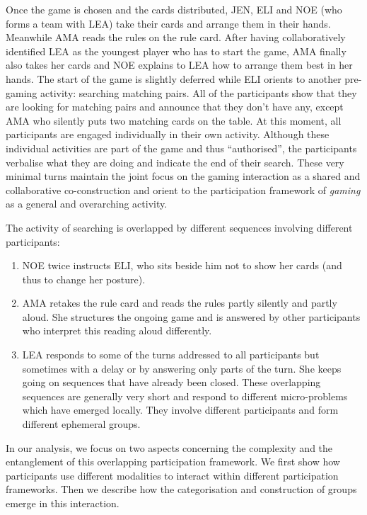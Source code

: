 \documentclass[output=paper]{langscibook}
\begin{document}
Once the game is chosen and the cards distributed, JEN, ELI and NOE (who forms a team with LEA) take their cards and arrange them in their hands. Meanwhile AMA reads the rules on the rule card. After having collaboratively identified LEA as the youngest player who has to start the game, AMA finally also takes her cards and NOE explains to LEA how to arrange them best in her hands. The start of the game is slightly deferred while ELI orients to another pre-gaming activity: searching matching pairs. All of the participants show that they are looking for matching pairs and announce that they don’t have any, except AMA who silently puts two matching cards on the table. At this moment, all participants are engaged individually in their own activity. Although these individual activities are part of the game and thus “authorised”, the participants verbalise what they are doing and indicate the end of their search. These very minimal turns maintain the joint focus on the gaming interaction as a shared and collaborative co-construction and orient to the participation framework of \textit{gaming} as a general and overarching activity.

The activity of searching is overlapped by different sequences involving different participants: 

\begin{enumerate}
\item NOE twice instructs ELI, who sits beside him not to show her cards (and thus to change her posture). 
\item AMA retakes the rule card and reads the rules partly silently and partly aloud. She structures the ongoing game and is answered by other participants who interpret this reading aloud differently. 
\item LEA responds to some of the turns addressed to all participants but sometimes with a delay or by answering only parts of the turn. She keeps going on sequences that have already been closed. These overlapping sequences are generally very short and respond to different micro-problems which have emerged locally. They involve different participants and form different ephemeral groups. 
\end{enumerate}

In our analysis, we focus on two aspects concerning the complexity and the entanglement of this overlapping participation framework. We first show how participants use different modalities to interact within different participation frameworks. Then we describe how the categorisation and construction of groups emerge in this interaction. 
\end{document}
